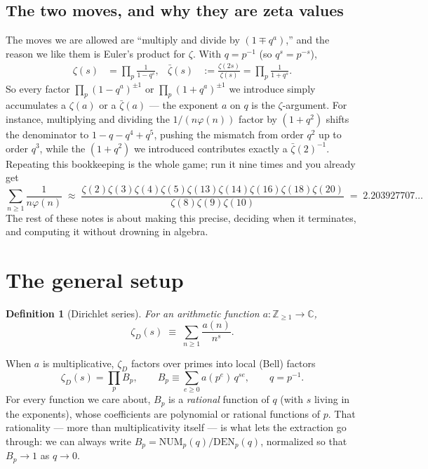 \documentclass[11pt]{article}
\newtheorem{definition}[theorem]{Definition}
\newcommand{\zD}{\zeta_D}
\newcommand{\zbar}{\bar\zeta}
\begin{document}
\subsection{The two moves, and why they are zeta values}

The moves we are allowed are ``multiply and divide by $(1\mp q^{a})$,'' and the
reason we like them is Euler's product for $\zeta$. With $q=p^{-1}$ (so
$q^{s}=p^{-s}$),
\begin{align}
\zeta(s) &= \prod_p\frac{1}{1-q^{s}}, &
\zbar(s) &:= \frac{\zeta(2s)}{\zeta(s)} = \prod_p\frac{1}{1+q^{s}}. \label{eq:zzbar}
\end{align}
So every factor $\prod_p(1-q^{a})^{\pm1}$ or $\prod_p(1+q^{a})^{\pm1}$ we introduce
simply accumulates a $\zeta(a)$ or a $\zbar(a)$ --- the exponent $a$ on $q$ is the
$\zeta$-argument. For instance, multiplying and dividing the $1/(n\varphi(n))$
factor by $(1+q^2)$ shifts the denominator to $1-q-q^4+q^5$, pushing the mismatch
from order $q^2$ up to order $q^3$, while the $(1+q^2)$ we introduced contributes
exactly a $\zbar(2)^{-1}$. Repeating this bookkeeping is the whole game; run it nine
times and you already get
\[
\sum_{n\ge1}\frac{1}{n\varphi(n)}
\;\approx\;
\frac{\zeta(2)\zeta(3)\zeta(4)\zeta(5)\zeta(13)\zeta(14)\zeta(16)\zeta(18)\zeta(20)}
     {\zeta(8)\zeta(9)\zeta(10)}
\;=\;2.203927707\ldots
\]
The rest of these notes is about making this precise, deciding when it terminates,
and computing it without drowning in algebra.

\section{The general setup}
\label{sec:setup}

\begin{definition}[Dirichlet series]
For an arithmetic function $a:\mathbb{Z}_{\ge1}\to\mathbb{C}$,
\[
\zD(s) \;\equiv\; \sum_{n\ge1} \frac{a(n)}{n^s}.
\]
\end{definition}

When $a$ is multiplicative, $\zD$ factors over primes into local (Bell) factors
\[
\zD(s) = \prod_p B_p, \qquad B_p \equiv \sum_{e\ge0} a(p^e)\, q^{se}, \qquad q=p^{-1}.
\]
For every function we care about, $B_p$ is a \emph{rational} function of $q$ (with
$s$ living in the exponents), whose coefficients are polynomial or rational
functions of $p$. That rationality --- more than multiplicativity itself --- is what
lets the extraction go through: we can always write
$B_p=\mathrm{NUM}_p(q)/\mathrm{DEN}_p(q)$, normalized so that $B_p\to1$ as $q\to0$.
\end{document}
